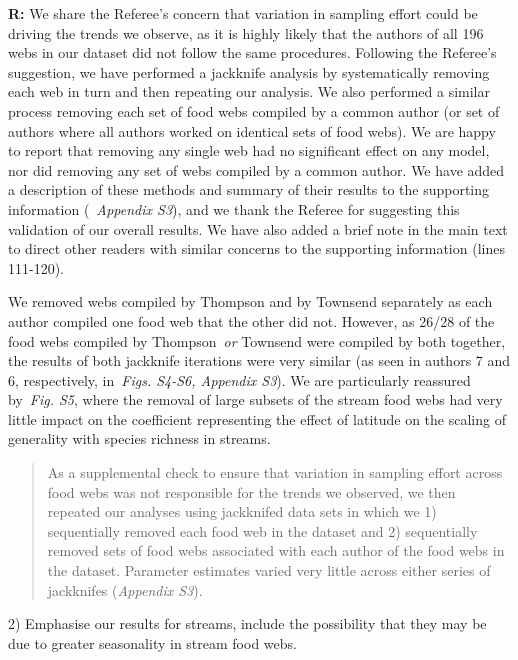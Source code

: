 \documentclass[12pt]{letter}
\begin{document}
  \textbf{R:} We share the Referee's concern that variation in sampling
  effort could be driving the trends we observe, as it is highly likely that
  the authors of all 196 webs in our dataset did not follow the same procedures.
  Following the Referee's suggestion, we have performed a jackknife analysis by
  systematically removing each web in turn and then repeating our analysis. We
  also performed a similar process removing each set of 
  food webs compiled by a common author (or set of authors
  where all authors worked on identical sets of food webs).
  We are happy to report that removing
  any single web had no significant effect on any model, 
  nor did removing any set of webs compiled by a common 
  author. 
  We have added a description of these methods and summary
  of their results to the supporting information 
  (~\emph{Appendix S3}), and we thank the Referee for 
  suggesting this validation of our overall results. We 
  have also added a brief note in the main text to direct 
  other readers with similar concerns to the supporting 
  information (lines 111-120). 


  We removed webs compiled by Thompson and by 
  Townsend separately as each author compiled one food
  web that the other did not. However, as 26/28 of the
  food webs compiled by Thompson~\emph{or} Townsend were
  compiled by both together, the results of both jackknife
  iterations were very similar (as seen in authors 7 and 6, 
  respectively, in~\emph{Figs. S4-S6, Appendix S3}). 
  We are particularly reassured by~\emph{Fig. S5}, where
  the removal of large subsets of the stream food webs
  had very little impact on the coefficient representing
  the effect of latitude on the scaling of generality with
  species richness in streams.


  \begin{quotation}

    As a supplemental check to ensure that variation in sampling effort across
    food webs was not responsible for the trends we observed, we then repeated
    our analyses using jackknifed data sets in which we 1) sequentially removed
    each food web in the dataset and 2) sequentially removed sets of food webs 
    associated with each author of the food webs in the dataset. Parameter 
    estimates varied very little across either series of jackknifes (\emph{Appendix S3}).

  \end{quotation}


   2) Emphasise our results for streams, include the possibility that they
   may be due to greater seasonality in stream food webs. 
\end{document}
